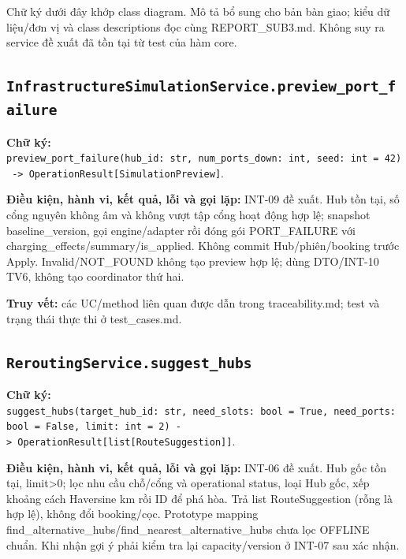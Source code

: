 \documentclass[11pt,a4paper]{article}
\begin{document}
Chữ ký dưới đây khớp class diagram. Mô tả bổ sung cho bản bàn giao; kiểu
dữ liệu/đơn vị và class descriptions đọc cùng REPORT\_SUB3.md. Không suy
ra service đề xuất đã tồn tại từ test của hàm core.

\hypertarget{infrastructuresimulationservice.preview_port_failure}{%
\subsection{\texorpdfstring{\texttt{InfrastructureSimulationService.preview\_port\_failure}}{InfrastructureSimulationService.preview\_port\_failure}}\label{infrastructuresimulationservice.preview_port_failure}}

\textbf{Chữ ký:}
\texttt{preview\_port\_failure(hub\_id:\ str,\ num\_ports\_down:\ int,\ seed:\ int\ =\ 42)\ -\textgreater{}\ OperationResult{[}SimulationPreview{]}}.

\textbf{Điều kiện, hành vi, kết quả, lỗi và gọi lặp:} INT-09 đề xuất.
Hub tồn tại, số cổng nguyên không âm và không vượt tập cổng hoạt động
hợp lệ; snapshot baseline\_version, gọi engine/adapter rồi đóng gói
PORT\_FAILURE với charging\_effects/summary/is\_applied. Không commit
Hub/phiên/booking trước Apply. Invalid/NOT\_FOUND không tạo preview hợp
lệ; dùng DTO/INT-10 TV6, không tạo coordinator thứ hai.

\textbf{Truy vết:} các UC/method liên quan được dẫn trong
traceability.md; test và trạng thái thực thi ở test\_cases.md.

\hypertarget{reroutingservice.suggest_hubs}{%
\subsection{\texorpdfstring{\texttt{ReroutingService.suggest\_hubs}}{ReroutingService.suggest\_hubs}}\label{reroutingservice.suggest_hubs}}

\textbf{Chữ ký:}
\texttt{suggest\_hubs(target\_hub\_id:\ str,\ need\_slots:\ bool\ =\ True,\ need\_ports:\ bool\ =\ False,\ limit:\ int\ =\ 2)\ -\textgreater{}\ OperationResult{[}list{[}RouteSuggestion{]}{]}}.

\textbf{Điều kiện, hành vi, kết quả, lỗi và gọi lặp:} INT-06 đề xuất.
Hub gốc tồn tại, limit\textgreater0; lọc nhu cầu chỗ/cổng và operational
status, loại Hub gốc, xếp khoảng cách Haversine km rồi ID để phá hòa.
Trả list RouteSuggestion (rỗng là hợp lệ), không đổi booking/cọc.
Prototype mapping
find\_alternative\_hubs/find\_nearest\_alternative\_hubs chưa lọc
OFFLINE chuẩn. Khi nhận gợi ý phải kiểm tra lại capacity/version ở
INT-07 sau xác nhận.
\end{document}
